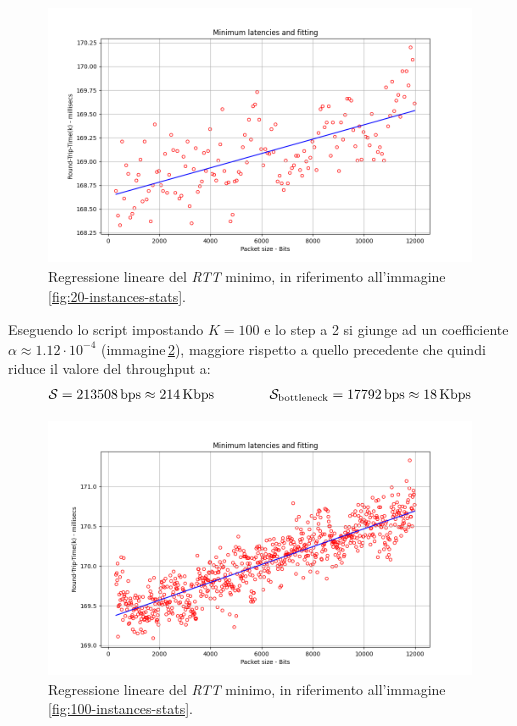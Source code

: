 \begin{figure}[h]
    \centering
    \includegraphics[width = .8\textwidth]{hw-2/report/imgs/20-instances/la-min-latencies.png}
    \caption{Regressione lineare del \textsl{RTT} minimo, in riferimento all'immagine\,\ref{fig:20-instances-stats}.}
    \label{fig:20-instances-min}
\end{figure}

\FloatBarrier\noindent Eseguendo lo script impostando $K = 100$ e lo step a 2 si giunge ad un coefficiente $\alpha \approx 1.12 \cdot 10^{-4}$ (immagine\,\ref{fig:100-instances-min}), maggiore rispetto a quello precedente che quindi riduce il valore del throughput a:
\begin{gather*}
    \mathcal{S} = 213508\,\text{bps} \approx  214\,\text{Kbps}  \hspace{40px} \mathcal{S}_{\text{bottleneck}} = 17792\,\text{bps} \approx  18\,\text{Kbps}
\end{gather*}

\begin{figure}[h]
    \centering
    \includegraphics[width = .8\textwidth]{hw-2/report/imgs/100-instances/la-min-latencies.png}
    \caption{Regressione lineare del \textsl{RTT} minimo, in riferimento all'immagine\,\ref{fig:100-instances-stats}.}
    \label{fig:100-instances-min}
\end{figure}

